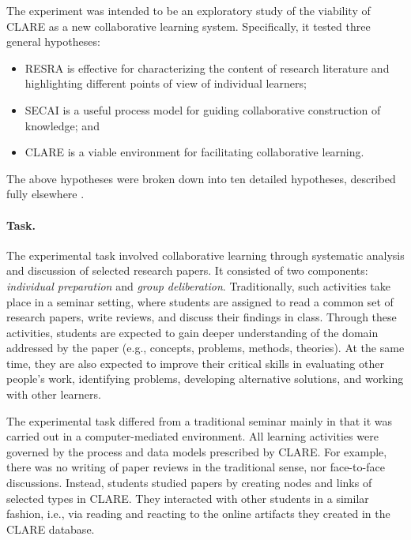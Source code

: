 The experiment was intended to be an exploratory study of the viability of
CLARE as a new collaborative learning system. Specifically, it tested three
general hypotheses:

\begin{itemize}
\item RESRA is effective for characterizing the content of research
  literature and highlighting different points of view of individual learners; 
  
\item SECAI is a useful process model for guiding collaborative
  construction of knowledge; and
  
\item CLARE is a viable environment for facilitating collaborative
  learning.
\end{itemize}

The above hypotheses were broken down into ten detailed hypotheses,
described fully elsewhere \cite{csdl-93-14}.

\paragraph{Task.}

The experimental task involved collaborative learning through systematic
analysis and discussion of selected research papers. It consisted of two
components: {\it individual preparation\/} and {\it group
deliberation\/}. Traditionally, such activities take place in a seminar
setting, where students are assigned to read a common set of research
papers, write reviews, and discuss their findings in class. Through these
activities, students are expected to gain deeper understanding of the
domain addressed by the paper (e.g., concepts, problems, methods,
theories). At the same time, they are also expected to improve their
critical skills in evaluating other people's work, identifying problems,
developing alternative solutions, and working with other learners.

The experimental task differed from a traditional seminar mainly in that it
was carried out in a computer-mediated environment. All learning activities
were governed by the process and data models prescribed by CLARE. For
example, there was no writing of paper reviews in the traditional sense,
nor face-to-face discussions. Instead, students studied papers by creating
nodes and links of selected types in CLARE. They interacted with other
students in a similar fashion, i.e., via reading and reacting to the online
artifacts they created in the CLARE database.


